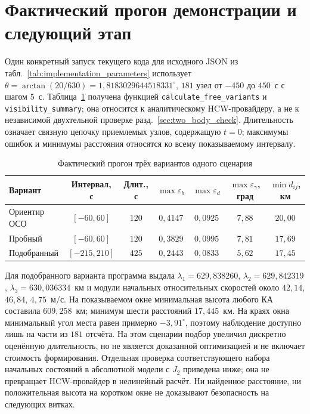 \documentclass[a4paper,12pt]{article}
\begin{document}
\section{Фактический прогон демонстрации и следующий этап}
\label{sec:next_stage}

Один конкретный запуск текущего кода для исходного JSON
из табл.~\ref{tab:implementation_parameters} использует
$\theta=\arctan(20/630)=1{,}8183029644518331^\circ$,
$181$ узел от $-450$ до $450$~с с шагом $5$~с.
Таблица~\ref{tab:demo_run} получена функцией
\texttt{calculate\_free\_variants} и
\texttt{visibility\_summary}; она относится к
аналитическому HCW-провайдеру, а не к независимой
двухтельной проверке разд.~\ref{sec:two_body_check}.
Длительность означает связную цепочку приемлемых
узлов, содержащую $t=0$; максимумы ошибок и
минимумы расстояния относятся ко всему
показываемому интервалу.

\begin{table}[htbp]
\centering\scriptsize
\caption{Фактический прогон трёх вариантов одного сценария}
\label{tab:demo_run}
\setlength{\tabcolsep}{3pt}
\begin{tabular}{lcccccc}
\toprule
Вариант & Интервал, с &
Длит., с & $\max\varepsilon_b$ &
$\max\varepsilon_d$ & $\max\varepsilon_\gamma$, град &
$\min d_{ij}$, км\\
\midrule
Ориентир ОСО & $[-60,60]$ & $120$ &
$0{,}4147$ & $0{,}0925$ & $7{,}88$ & $20{,}00$\\
Пробный & $[-60,60]$ & $120$ &
$0{,}3829$ & $0{,}0995$ & $7{,}81$ & $17{,}69$\\
Подобранный & $[-215,210]$ & $425$ &
$0{,}2443$ & $0{,}0833$ & $5{,}62$ & $17{,}45$\\
\bottomrule
\end{tabular}
\end{table}

Для подобранного варианта программа выдала
$\lambda_1=629{,}838260$,
$\lambda_2=629{,}842319$,
$\lambda_3=630{,}036334$~км и модули начальных
относительных скоростей около
$42{,}14$, $46{,}84$, $4{,}75$~м/с.
На показываемом окне минимальная высота любого КА
составила $609{,}258$~км; минимум шести расстояний
$17{,}445$~км. На краях окна минимальный угол
места равен примерно $-3{,}91^\circ$, поэтому
наблюдение доступно лишь на части из $181$ отсчёта.
На этом сценарии подбор увеличил дискретно оценённую
длительность, но не является доказанной оптимизацией
и не включает стоимость формирования. Отдельная
проверка соответствующего набора начальных состояний
в абсолютной модели с $J_2$ приведена ниже;
она не превращает HCW-провайдер в нелинейный расчёт.
Ни найденное расстояние, ни положительная высота
на коротком окне не доказывают безопасность
на следующих витках.
\end{document}
